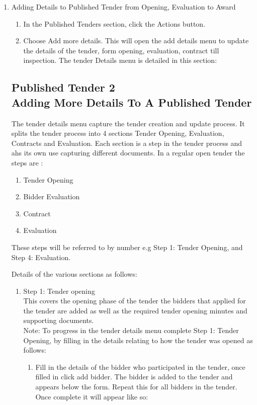 \documentclass [12pt]{book}
\begin{document}
\begin{enumerate}
\item Adding Details to Published Tender from Opening, Evaluation to Award

\begin{enumerate}
\item In the Published Tenders section, click the Actions button.
\item Choose Add more details.
This will open the add details menu to update the details of the tender, form opening, evaluation, contract till inspection.
The tender Details menu is detailed in this section:
\end{enumerate}

\subsection {Published Tender 2\\ Adding More Details To A Published Tender}

The tender details menu capture the tender creation and update process.
It splits the tender process into 4 sections Tender Opening, Evaluation, Contracts and Evaluation.
Each section is a step in the tender process and ahs its own use capturing different documents.
In a regular open tender the steps are :
\begin{enumerate}
\item Tender Opening
\item Bidder Evaluation
\item Contract  
\item Evaluation
\end{enumerate}

These steps will be referred to by number e.g Step 1: Tender Opening, and Step 4: Evaluation. 

Details of the various sections as follows: \\
\begin{enumerate}
\item{Step 1: Tender opening} \\
        This covers the opening phase of the tender the bidders that applied for the tender are added as well as the required tender opening minutes and supporting documents. \\


Note: To progress in the tender details menu complete Step 1: Tender Opening, by filling in the details relating to how the tender was opened as follows:

\begin{enumerate}
    \item	Fill in the details of the bidder who participated in the tender, once filled in click add bidder. 
    The bidder is added to the tender and appears below the form. Repeat this for all bidders in the tender. Once complete it will appear like so:
    

\end{enumerate}
\end{enumerate}
\end{enumerate}
\end{document}
